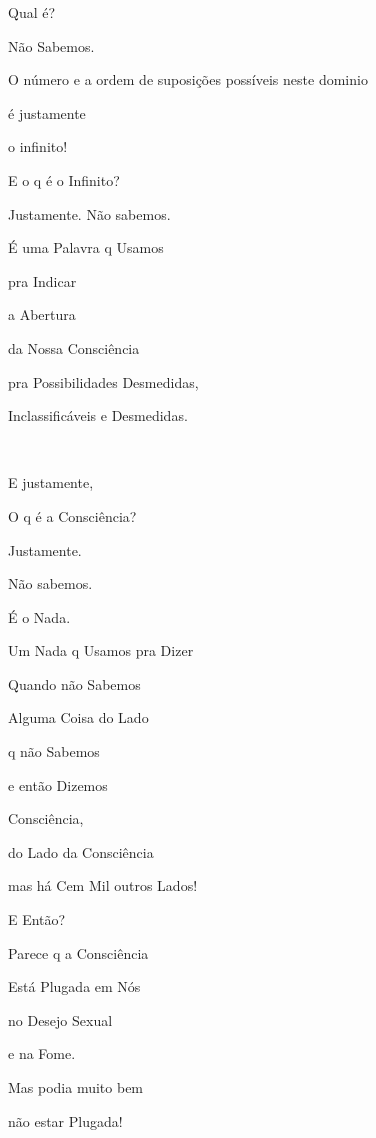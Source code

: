 Qual é?

Não Sabemos.


O número e a ordem de suposições possíveis neste dominio

é justamente

o infinito!



E o q é o Infinito?

Justamente. Não sabemos.


É uma Palavra q Usamos

pra Indicar

a Abertura

da Nossa Consciência

pra Possibilidades Desmedidas, 

Inclassificáveis e Desmedidas.

~



E justamente,

O q é a Consciência?

Justamente.

Não sabemos.

É o Nada.

Um Nada q Usamos pra Dizer

Quando não Sabemos

Alguma Coisa do Lado

q não Sabemos

e então Dizemos

Consciência,

do Lado da Consciência

mas há Cem Mil outros Lados!


E Então?

Parece q a Consciência

Está Plugada em Nós

no Desejo Sexual

e na Fome.


Mas podia muito bem

não estar Plugada!

